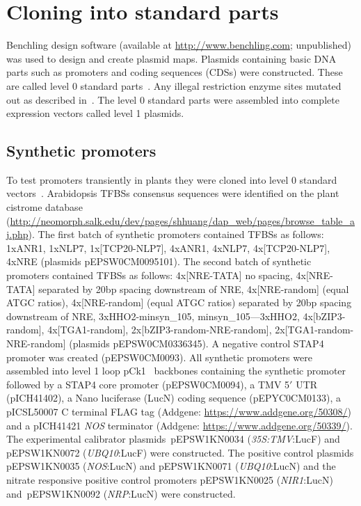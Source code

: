 \documentclass[../main.tex]{subfiles}
\begin{document}
\section{Cloning into standard parts}\label{chapter2:methods:cloning-into-standard-parts}

Benchling design software (available at \url{http://www.benchling.com}; unpublished) was used to design and create plasmid maps.
Plasmids containing basic DNA parts such as promoters and coding sequences (CDSs) were constructed.
These are called level 0 standard parts~\autocite{marillonnetSyntheticDNAAssembly2020}.
Any illegal restriction enzyme sites mutated out as described in~\textcite*{patronStandardsPlantSynthetic2015}.
The level 0 standard parts were assembled into complete expression vectors called level 1 plasmids.

\subsection{Synthetic promoters}\label{chapter2:methods:synthetic-promoters}

To test promoters transiently in plants they were cloned into level 0 standard vectors~\autocite{marillonnetSyntheticDNAAssembly2020}.
Arabidopsis TFBSs consensus sequences were identified on the plant cistrome database \autocite{omalleyCistromeEpicistromeFeatures2016} (\url{http://neomorph.salk.edu/dev/pages/shhuang/dap_web/pages/browse_table_aj.php}).
The first batch of synthetic promoters contained TFBSs as follows: 1xANR1, 1xNLP7, 1x[TCP20-NLP7], 4xANR1, 4xNLP7, 4x[TCP20-NLP7], 4xNRE (plasmids pEPSW0CM0095\textendash{}101).
The second batch of synthetic promoters contained TFBSs as follows: 4x[NRE-TATA] no spacing, 4x[NRE-TATA] separated by 20bp spacing downstream of NRE, 4x[NRE-random] (equal ATGC ratios), 4x[NRE-random] (equal ATGC ratios) separated by 20bp spacing downstream of NRE, 3xHHO2-minsyn\_105, minsyn\_105—3xHHO2, 4x[bZIP3-random], 4x[TGA1-random], 2x[bZIP3-random-NRE-random], 2x[TGA1-random-NRE-random] (plasmids pEPSW0CM0336\textendash{}345).
A negative control STAP4 promoter was created (pEPSW0CM0093).
All synthetic promoters were assembled into level 1  loop pCk1~\autocite{pollakLoopAssemblySimple2018} backbones containing the synthetic promoter followed by a STAP4 core promoter (pEPSW0CM0094), a TMV 5$\prime$ UTR (pICH41402), a Nano luciferase (LucN) coding sequence (pEPYC0CM0133), a pICSL50007 C terminal FLAG tag (Addgene: \url{https://www.addgene.org/50308/}) and a pICH41421 \textit{NOS} terminator (Addgene: \url{https://www.addgene.org/50339/}).
The experimental calibrator plasmids~pEPSW1KN0034 (\textit{35S:TMV}:LucF) and pEPSW1KN0072 (\textit{UBQ10}:LucF) were constructed.
The positive control plasmids pEPSW1KN0035 (\textit{NOS}:LucN) and pEPSW1KN0071 (\textit{UBQ10}:LucN) and the nitrate responsive positive control promoters pEPSW1KN0025 (\textit{NIR1}:LucN) and~pEPSW1KN0092 (\textit{NRP}:LucN) were constructed.
\end{document}

